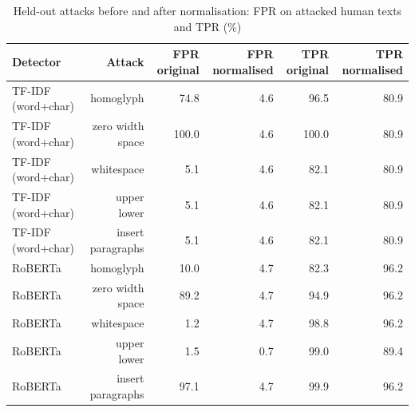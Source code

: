 \begin{table}[!t]
\centering
\caption{Held-out attacks before and after normalisation: FPR on attacked human texts and TPR (\%)}
\label{tab:normalisation_defence}
\footnotesize
\begin{tabular}{lrrrrr}
\toprule
\textbf{Detector} & \textbf{Attack} & \textbf{FPR original} & \textbf{FPR normalised} & \textbf{TPR original} & \textbf{TPR normalised} \\
\midrule
TF-IDF (word+char) & homoglyph & 74.8 & 4.6 & 96.5 & 80.9 \\
TF-IDF (word+char) & zero width space & 100.0 & 4.6 & 100.0 & 80.9 \\
TF-IDF (word+char) & whitespace & 5.1 & 4.6 & 82.1 & 80.9 \\
TF-IDF (word+char) & upper lower & 5.1 & 4.6 & 82.1 & 80.9 \\
TF-IDF (word+char) & insert paragraphs & 5.1 & 4.6 & 82.1 & 80.9 \\
RoBERTa & homoglyph & 10.0 & 4.7 & 82.3 & 96.2 \\
RoBERTa & zero width space & 89.2 & 4.7 & 94.9 & 96.2 \\
RoBERTa & whitespace & 1.2 & 4.7 & 98.8 & 96.2 \\
RoBERTa & upper lower & 1.5 & 0.7 & 99.0 & 89.4 \\
RoBERTa & insert paragraphs & 97.1 & 4.7 & 99.9 & 96.2 \\
\bottomrule
\end{tabular}
\end{table}
